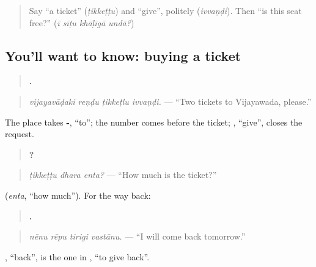 \label{lesson:TE-C321-tikkettu-ivvandi}



\begin{quote}
Say \textquotedblleft{}a ticket\textquotedblright{} (\emph{ṭikkeṭṭu}) and \textquotedblleft{}give\textquotedblright{}, politely (\emph{ivvaṇḍi}). Then \textquotedblleft{}is this seat free?\textquotedblright{} (\emph{ī sīṭu khāḷīgā undā?})
\end{quote}

\subsection*{You'll want to know: buying a ticket}
\begin{quote}
\textbf{   .}
\end{quote}

\begin{quote}
\emph{vijayavāḍaki reṇḍu ṭikkeṭlu ivvaṇḍi.} — \textquotedblleft{}Two tickets to Vijayawada, please.\textquotedblright{}
\end{quote}

The place takes \textbf{-}, \textquotedblleft{}to\textquotedblright{}; the number comes before the ticket; \textbf{}, \textquotedblleft{}give\textquotedblright{}, closes the request.

\begin{quote}
\textbf{  ?}
\end{quote}

\begin{quote}
\emph{ṭikkeṭṭu dhara enta?} — \textquotedblleft{}How much is the ticket?\textquotedblright{}
\end{quote}

\textbf{} (\emph{enta}, \textquotedblleft{}how much\textquotedblright{}). For the way back:

\begin{quote}
\textbf{   .}
\end{quote}

\begin{quote}
\emph{nēnu rēpu tirigi vastānu.} — \textquotedblleft{}I will come back tomorrow.\textquotedblright{}
\end{quote}

\textbf{}, \textquotedblleft{}back\textquotedblright{}, is the one in \textbf{ }, \textquotedblleft{}to give back\textquotedblright{}.

